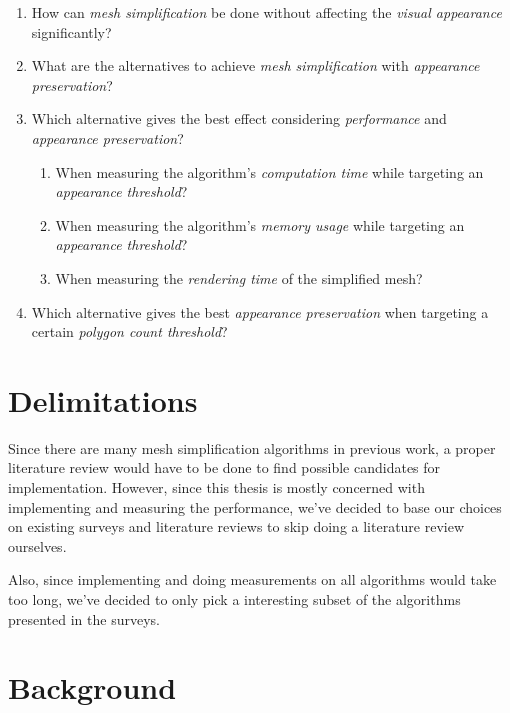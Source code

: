 \begin{enumerate}
\item How can \emph{mesh simplification} be done without affecting the \emph{visual appearance} significantly?

\item What are the alternatives to achieve \emph{mesh simplification} with \emph{appearance preservation}?

\item{Which alternative gives the best effect considering \emph{performance} and  \emph{appearance preservation}?
  \begin{enumerate}
  \item When measuring the algorithm's \emph{computation time} while targeting an \emph{appearance threshold}?
  \item When measuring the algorithm's \emph{memory usage} while targeting an \emph{appearance threshold}?
  \item When measuring the \emph{rendering time} of the simplified mesh? 
  \end{enumerate}
}
\item Which alternative gives the best \emph{appearance preservation} when targeting a certain \emph{polygon count threshold}?
\end{enumerate}


\section{Delimitations}
\label{sec:delimitations}

Since there are many mesh simplification algorithms in previous work, a proper literature review would have to be done to find possible candidates for implementation. However, since this thesis is mostly concerned with implementing and measuring the performance, we've decided to base our choices on existing surveys and literature reviews to skip doing a literature review ourselves.

Also, since implementing and doing measurements on all algorithms would take too long, we've decided to only pick a interesting subset of the algorithms presented in the surveys.

\section{Background}
\label{sec:background}





